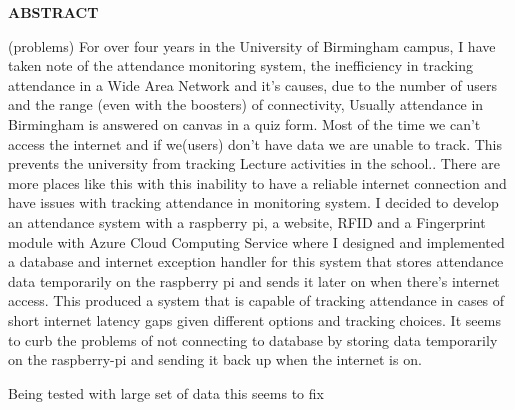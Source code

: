 \providecommand\phantomsection{} \phantomsection
\begin{center}
\providecommand\pdfbookmark[3][]{} \pdfbookmark[0]{Abstract}{bm:Abstract}
\vspace*{1in}
\textbf{ABSTRACT}\\[2\baselineskip]
\end{center}

(problems)
For over four years in the University of Birmingham campus, I  have taken note of the attendance monitoring system, the inefficiency in tracking attendance in a Wide Area Network and it's causes, due to the number of users and the range (even with the boosters) of connectivity, Usually attendance in Birmingham is answered on canvas in a quiz form. Most of the time 
we can't access the internet and if we(users) don't have data we are unable to track. This prevents the 
university from tracking Lecture activities in the school.. There are more places like this with this inability to have a reliable internet connection and have issues with tracking attendance in monitoring system. I decided to develop an attendance system with a raspberry pi, a website, RFID and a Fingerprint module with Azure Cloud Computing Service where I designed and implemented a database and internet exception handler for this system that stores attendance data temporarily on the raspberry pi and sends it later on when there's internet access. This produced a system that is capable of tracking attendance in cases of short internet latency gaps given different options and tracking choices. It seems to curb the problems of not connecting to database by storing data temporarily on the raspberry-pi and sending it back up when the internet is on.

Being tested with large set of data this seems to fix 
\textbf{}



